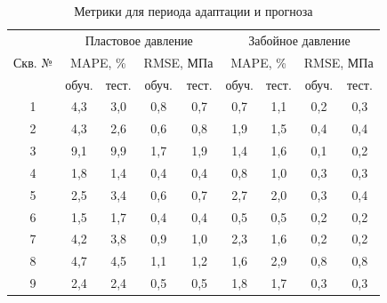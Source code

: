 \documentclass[14pt]{article}
\begin{document}
\begin{table}[!htb]
	\caption{Метрики для периода адаптации и прогноза}	
	\label{tabl:m9_well_m3k}	
	\begin{center}
		\begin{tabular}{c|c|c|c|c||c|c|c|c}
			\hline
			\multirow{3}{*}{Скв. №} & \multicolumn{4}{c||}{Пластовое давление} & \multicolumn{4}{c|}{Забойное давление} \\\cline{2-9}
			& \multicolumn{2}{c|}{MAPE, \%} & \multicolumn{2}{c||}{RMSE, МПа} & \multicolumn{2}{c|}{MAPE, \%} & \multicolumn{2}{c|}{RMSE, МПа} \\\cline{2-9}
			& обуч. & тест. & обуч.&тест. & обуч. & тест. & обуч.&тест.\\
			\hline
			1 & 4,3 & 3,0 & 0,8 & 0,7 & 0,7 & 1,1 & 0,2 & 0,3 \\
			2 & 4,3 & 2,6 & 0,6 & 0,8 & 1,9 & 1,5 & 0,4 & 0,4 \\
			3 & 9,1 & 9,9 & 1,7 & 1,9 & 1,4 & 1,6 & 0,1 & 0,2 \\
			4 & 1,8 & 1,4 & 0,4 & 0,4 & 0,8 & 1,0 & 0,3 & 0,3 \\
			5 & 2,5 & 3,4 & 0,6 & 0,7 & 2,7 & 2,0 & 0,3 & 0,4 \\
			6 & 1,5 & 1,7 & 0,4 & 0,4 & 0,5 & 0,5 & 0,2 & 0,2 \\
			7 & 4,2 & 3,8 & 0,9 & 1,0 & 2,3 & 1,6 & 0,2 & 0,2 \\
			8 & 4,7 & 4,5 & 1,1 & 1,2 & 1,6 & 2,9 & 0,8 & 0,8 \\
			9 & 2,4 & 2,4 & 0,5 & 0,5 & 1,8 & 1,7 & 0,3 & 0,3 \\
			\hline
			
		\end{tabular}
	\end{center}
\end{table}
\end{document}
